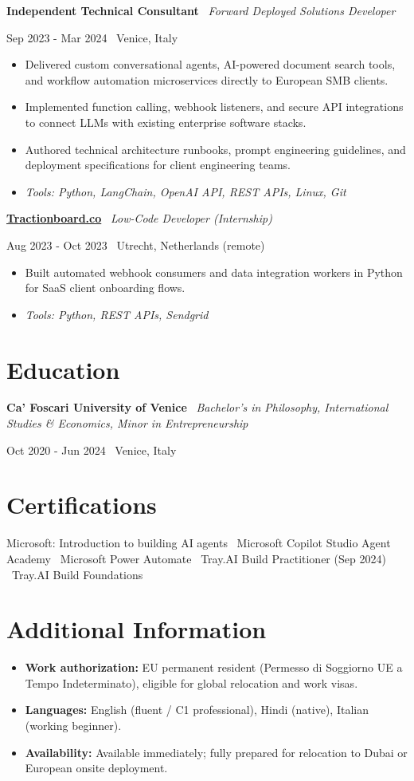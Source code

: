 \documentclass[a4paper,10pt]{article}
\newcommand{\role}[4]{%
  \vspace{2pt}\noindent
  \begin{minipage}[t]{0.70\textwidth}\raggedright\textbf{#1} \textbullet\ \textit{#3}\end{minipage}%
  \hfill
  \begin{minipage}[t]{0.28\textwidth}\raggedleft\footnotesize\color{gray}#2 \textbullet\ #4\end{minipage}%
  \vspace{1pt}%
}
\begin{document}
\role{Independent Technical Consultant}{Sep 2023 - Mar 2024}{Forward Deployed Solutions Developer}{Venice, Italy}
\begin{itemize}
  \item Delivered custom conversational agents, AI-powered document search tools, and workflow automation microservices directly to European SMB clients.
  \item Implemented function calling, webhook listeners, and secure API integrations to connect LLMs with existing enterprise software stacks.
  \item Authored technical architecture runbooks, prompt engineering guidelines, and deployment specifications for client engineering teams.
  \item \textit{Tools: Python, LangChain, OpenAI API, REST APIs, Linux, Git}
\end{itemize}

\role{\href{https://tractionboard.co}{Tractionboard.co}}{Aug 2023 - Oct 2023}{Low-Code Developer (Internship)}{Utrecht, Netherlands (remote)}
\begin{itemize}
  \item Built automated webhook consumers and data integration workers in Python for SaaS client onboarding flows.
  \item \textit{Tools: Python, REST APIs, Sendgrid}
\end{itemize}

\section{Education}
\role{Ca' Foscari University of Venice}{Oct 2020 - Jun 2024}{Bachelor's in Philosophy, International Studies \& Economics, Minor in Entrepreneurship}{Venice, Italy}

\section{Certifications}
Microsoft: Introduction to building AI agents \textbullet\ Microsoft Copilot Studio Agent Academy \textbullet\ Microsoft Power Automate \textbullet\ Tray.AI Build Practitioner (Sep 2024) \textbullet\ Tray.AI Build Foundations

\section{Additional Information}
\begin{itemize}
  \item \textbf{Work authorization:} EU permanent resident (Permesso di Soggiorno UE a Tempo Indeterminato), eligible for global relocation and work visas.
  \item \textbf{Languages:} English (fluent / C1 professional), Hindi (native), Italian (working beginner).
  \item \textbf{Availability:} Available immediately; fully prepared for relocation to Dubai or European onsite deployment.
\end{itemize}
\end{document}
